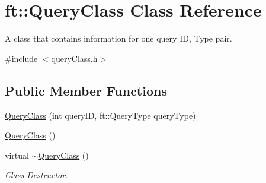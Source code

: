\hypertarget{classft_1_1QueryClass}{}\section{ft\+:\+:Query\+Class Class Reference}
\label{classft_1_1QueryClass}


A class that contains information for one query ID, Type pair.  




{\ttfamily \#include $<$query\+Class.\+h$>$}

\subsection*{Public Member Functions}
\begin{DoxyCompactItemize}
\item 
\hyperlink{classft_1_1QueryClass_acb92ce2a1c98cdc3d54ef12276b953a1}{Query\+Class} (int query\+ID, ft\+::\+Query\+Type query\+Type)
\item 
\hyperlink{classft_1_1QueryClass_a9fdd93df1f397146c31e4c0bd16bf7e2}{Query\+Class} ()
\item 
\mbox{\label{classft_1_1QueryClass_ad75bea7c483469be7a8a522626903e88}} 
virtual \hyperlink{classft_1_1QueryClass_ad75bea7c483469be7a8a522626903e88}{$\sim$\+Query\+Class} ()
\begin{DoxyCompactList}\small\item\em Class Destructor. \end{DoxyCompactList}\end{DoxyCompactItemize}
